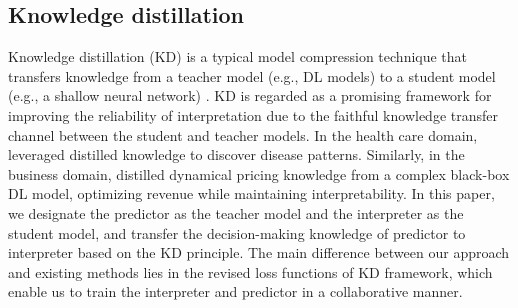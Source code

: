 \subsection{Knowledge distillation}
Knowledge distillation (KD) is a typical model compression technique that transfers knowledge from a teacher model (e.g., DL models) to a student model (e.g., a shallow neural network) \cite{38,39}. KD is regarded as a promising framework for improving the reliability of interpretation due to the faithful knowledge transfer channel between the student and teacher models. In the health care domain, \cite{che2016interpretable} leveraged distilled knowledge to discover disease patterns. Similarly, in the business domain, \cite{biggs2021model} distilled dynamical pricing knowledge from a complex black-box DL model, optimizing revenue while maintaining interpretability. In this paper, we designate the predictor as the teacher model and the interpreter as the student model, and transfer the decision-making knowledge of predictor to interpreter based on the KD principle. The main difference between our approach and existing methods lies in the revised loss functions of KD framework, which enable us to train the interpreter and predictor in a collaborative manner.


